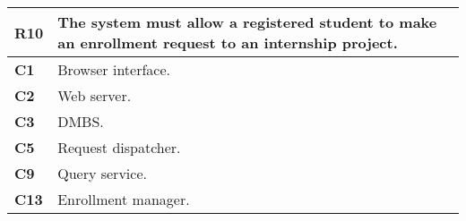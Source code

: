 \begin{table}[H]
    \centering
    \begin{tabular}{|l|m{10cm}|}
        \hline \textbf{R10} & The system must allow a registered student to make an enrollment request to an internship project.\\
        \hline \textbf{C1} & Browser interface. \\
        \hline \textbf{C2} & Web server. \\
        \hline \textbf{C3} & DMBS. \\
        \hline \textbf{C5} & Request dispatcher. \\
        \hline \textbf{C9} & Query service. \\
        \hline \textbf{C13} & Enrollment manager. \\
        \hline
    \end{tabular}
\end{table}

